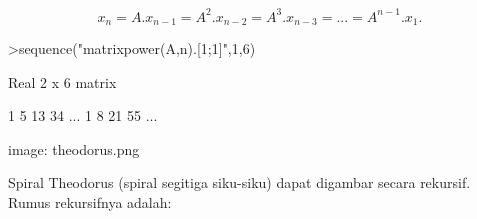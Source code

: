 \documentclass[a4paper,10pt]{article}
\begin{document}
\begin{eulernotebook}
\begin{eulercomment}
\begin{eulercomment}
\begin{eulercomment}
\begin{eulercomment}
\begin{eulercomment}
\begin{eulercomment}
\begin{eulercomment}
\begin{eulercomment}
\begin{eulercomment}
\begin{eulercomment}
\begin{eulercomment}
\begin{eulercomment}
\begin{eulercomment}
\begin{eulercomment}
\begin{eulercomment}
\begin{eulercomment}
\begin{eulercomment}
\begin{eulercomment}
\begin{eulercomment}
\begin{eulercomment}
\begin{eulercomment}
\begin{eulercomment}
\begin{eulercomment}
\begin{eulercomment}
\begin{eulercomment}
\begin{eulercomment}
\begin{eulercomment}
\begin{eulercomment}
\begin{eulercomment}
\end{eulercomment}
\begin{eulerformula}
\[
x_n=A.x_{n-1}=A^2.x_{n-2}=A^3.x_{n-3}= ... = A^{n-1}.x_1.
\]
\end{eulerformula}
\begin{eulerprompt}
>sequence("matrixpower(A,n).[1;1]",1,6)
\end{eulerprompt}
\begin{euleroutput}
  Real 2 x 6 matrix
  
              1             5            13            34     ...
              1             8            21            55     ...
\end{euleroutput}
\begin{eulercomment}
\begin{eulercomment}
\begin{eulercomment}
image: theodorus.png

Spiral Theodorus (spiral segitiga siku-siku) dapat digambar secara
rekursif. Rumus rekursifnya adalah:


\end{eulercomment}
\end{eulercomment}
\end{eulercomment}
\end{eulercomment}
\end{eulercomment}
\end{eulercomment}
\end{eulercomment}
\end{eulercomment}
\end{eulercomment}
\end{eulercomment}
\end{eulercomment}
\end{eulercomment}
\end{eulercomment}
\end{eulercomment}
\end{eulercomment}
\end{eulercomment}
\end{eulercomment}
\end{eulercomment}
\end{eulercomment}
\end{eulercomment}
\end{eulercomment}
\end{eulercomment}
\end{eulercomment}
\end{eulercomment}
\end{eulercomment}
\end{eulercomment}
\end{eulercomment}
\end{eulercomment}
\end{eulercomment}
\end{eulercomment}
\end{eulercomment}
\end{eulernotebook}
\end{document}
